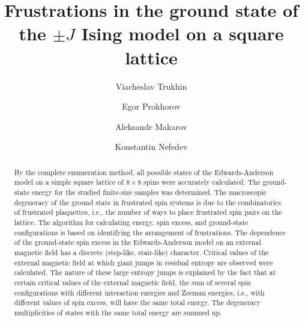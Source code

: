 \documentclass[utf8, babel, sor, jor, amsmath, amssymb, reprint]{elsarticle} %
\begin{document}
\begin{frontmatter}


\title{Frustrations in the ground state of the $\pm J$ Ising model on a square lattice}

\author[mainaddress, secondaryaddress]{Viacheslav Trukhin}

\author[mainaddress]{Egor Prokhorov}

\author[mainaddress, secondaryaddress]{Aleksandr Makarov}

\author[mainaddress, secondaryaddress]{Konstantin Nefedev}


\address[mainaddress]{Far Eastern Federal University, Vladivostok, Russky Island, 10 Ajax Bay, 690922, the Russian Federation}
\address[secondaryaddress]{Institute of Applied Mathematics, Far Eastern Branch, Russian Academy of Science, Vladivostok, Radio 7, 690041, the Russian Federation}

\begin{abstract}

By the complete enumeration method, all possible states of the Edwards-Anderson model on a simple square lattice of $8 \times 8$ spins were accurately calculated. The ground-state energy for the studied finite-size samples was determined. The macroscopic degeneracy of the ground state in frustrated spin systems is due to the combinatorics of frustrated plaquettes, i.e., the number of ways to place frustrated spin pairs on the lattice. The algorithm for calculating energy, spin excess, and ground-state configurations is based on identifying the arrangement of frustrations. The dependence of the ground-state spin excess in the Edwards-Anderson model on an external magnetic field has a discrete (step-like, stair-like) character. Critical values of the external magnetic field at which giant jumps in residual entropy are observed were calculated. The nature of these large entropy jumps is explained by the fact that at certain critical values of the external magnetic field, the sum of several spin configurations with different interaction energies and Zeeman energies, i.e., with different values of spin excess, will have the same total energy. The degeneracy multiplicities of states with the same total energy are summed up.

\end{abstract}



\end{frontmatter}
\end{document}
